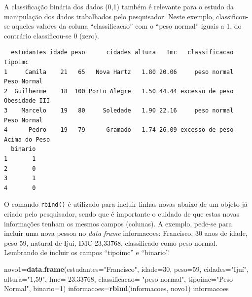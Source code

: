 \documentclass[12pt,brazil,oneside]{book}
\newenvironment{Shaded}{\begin{snugshade}}{\end{snugshade}}
\newcommand{\CommentTok}[1]{\textcolor[rgb]{0.56,0.35,0.01}{\textit{#1}}}
\newcommand{\DataTypeTok}[1]{\textcolor[rgb]{0.13,0.29,0.53}{#1}}
\newcommand{\DecValTok}[1]{\textcolor[rgb]{0.00,0.00,0.81}{#1}}
\newcommand{\FloatTok}[1]{\textcolor[rgb]{0.00,0.00,0.81}{#1}}
\newcommand{\KeywordTok}[1]{\textcolor[rgb]{0.13,0.29,0.53}{\textbf{#1}}}
\newcommand{\NormalTok}[1]{#1}
\newcommand{\OperatorTok}[1]{\textcolor[rgb]{0.81,0.36,0.00}{\textbf{#1}}}
\newcommand{\StringTok}[1]{\textcolor[rgb]{0.31,0.60,0.02}{#1}}
\begin{document}
A classificação binária dos dados (0,1) também é relevante para o estudo da manipulação dos dados trabalhados pelo pesquisador. Neste exemplo, classificou-se aqueles valores da coluna ``classificacao'' com o ``peso normal'' iguais a 1, do contrário classificou-se 0 (zero).

\begin{Shaded}
\end{Shaded}

\begin{verbatim}
  estudantes idade peso      cidades altura   Imc   classificacao       tipoimc
1     Camila    21   65   Nova Hartz   1.80 20.06     peso normal   Peso Normal
2  Guilherme    18  100 Porto Alegre   1.50 44.44 excesso de peso Obesidade III
3    Marcelo    19   80     Soledade   1.90 22.16     peso normal   Peso Normal
4      Pedro    19   79      Gramado   1.74 26.09 excesso de peso Acima do Peso
  binario
1       1
2       0
3       1
4       0
\end{verbatim}

O comando \texttt{rbind()} é utilizado para incluir linhas novas abaixo de um objeto já criado pelo pesquisador, sendo que é importante o cuidado de que estas novas informações tenham os mesmos campos (colunas). A exemplo, pede-se para incluir uma nova pessoa no \emph{data frame} informacoes: Francisco, 30 anos de idade, peso 59, natural de Ijuí, IMC 23,33768, classificado como peso normal. Lembrando de incluir os campos ``tipoimc'' e ``binario''.

\begin{Shaded}
\begin{Highlighting}[]
\NormalTok{novo1=}\KeywordTok{data.frame}\NormalTok{(}\DataTypeTok{estudantes=}\StringTok{"Francisco"}\NormalTok{, }\DataTypeTok{idade=}\DecValTok{30}\NormalTok{, }\DataTypeTok{peso=}\DecValTok{59}\NormalTok{, }
                 \DataTypeTok{cidades=}\StringTok{"Ijuí"}\NormalTok{, }
                 \DataTypeTok{altura=}\StringTok{"1,59"}\NormalTok{, }
                 \DataTypeTok{Imc=} \FloatTok{23.33768}\NormalTok{, }
                 \DataTypeTok{classificacao=} \StringTok{"peso normal"}\NormalTok{,}
                 \DataTypeTok{tipoimc=}\StringTok{"Peso Normal"}\NormalTok{, }
                 \DataTypeTok{binario=}\DecValTok{1}\NormalTok{)}
\NormalTok{informacoes=}\KeywordTok{rbind}\NormalTok{(informacoes, novo1)}
\NormalTok{informacoes}
\end{Highlighting}
\end{Shaded}
\end{document}
